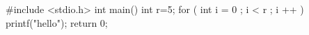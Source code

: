 #include <stdio.h>
int main(){
	int r=5;
	for ( int i = 0 ; i < r ; i ++ )
	 printf("hello");
	return 0;
}